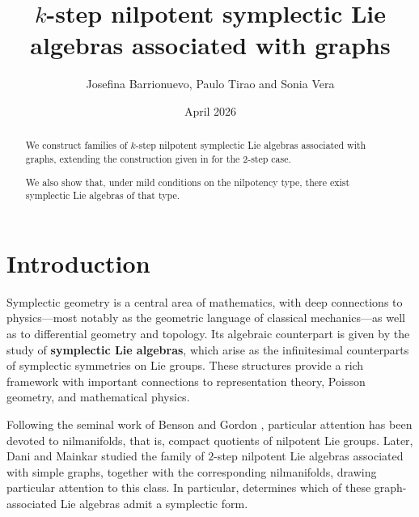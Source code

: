 \documentclass[a4paper,11pt]{amsart}
\theoremstyle{definition}
\theoremstyle{remark}
\numberwithin{equation}{section}
\begin{document}
 	
\title[$k$-step nilpotent symplectic Lie algebras]{$k$-step nilpotent symplectic Lie algebras associated with graphs}




\author{Josefina Barrionuevo, Paulo Tirao and Sonia Vera}




\date{April 2026}




\begin{abstract}
We construct families of $k$-step nilpotent symplectic Lie algebras associated with graphs, 
extending the construction given in \cite{PT} for the 2-step case. 

We also show that, under mild conditions on the nilpotency type, there exist symplectic Lie algebras of that type.
\end{abstract}



\maketitle




\setcounter{section}{-1}
\section{Introduction}

Symplectic geometry is a central area of mathematics, with deep connections to physics---most notably as the geometric language of classical mechanics---as well as to differential geometry and topology. Its algebraic counterpart is given by the study of \textbf{symplectic Lie algebras}, which arise as the infinitesimal counterparts of symplectic symmetries on Lie groups. These structures provide a rich framework with important connections to representation theory, Poisson geometry, and mathematical physics.

Following the seminal work of Benson and Gordon \cite{BG}, particular attention has been devoted to nilmanifolds, that is, compact quotients of nilpotent Lie groups. Later, Dani and Mainkar \cite{DM} studied the family of \(2\)-step nilpotent Lie algebras associated with simple graphs, together with the corresponding nilmanifolds, drawing particular attention to this class. In particular, \cite{PT} determines which of these graph-associated Lie algebras admit a symplectic form.
\end{document}
